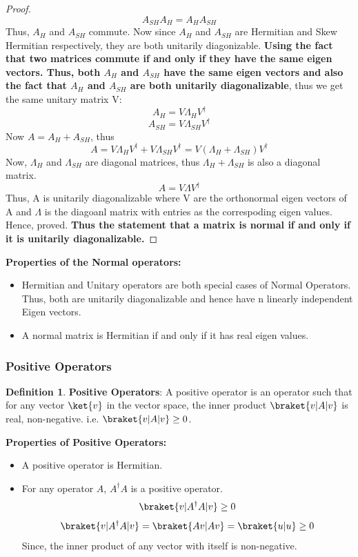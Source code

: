 \documentclass[12pt, oneside]{book}
\theoremstyle{definition}
\newtheorem{definition}{Definition}[section]
\theoremstyle{definition}
\theoremstyle{remark}
\begin{document}
\begin{proof}
    \[A_{SH}A_H=A_HA_{SH}\]
    Thus, $A_H$ and $A_{SH}$ commute. Now since $A_H$ and $A_{SH}$ are Hermitian and Skew Hermitian respectively, they are both unitarily diagonizable.
    \textbf{Using the fact that two matrices commute if and only if they have the same eigen vectors. Thus, both $A_H$ and $A_{SH}$ have the same eigen vectors and also the fact that 
    $A_H$ and $A_{SH}$ are both unitarily diagonalizable}, thus we get the same
    unitary matrix V:
    \[ A_H=V\Lambda_H V^{\dagger} \]
    \[ A_{SH}=V\Lambda_{SH} V^{\dagger} \]
    Now $A=A_H+A_{SH}$, thus
    \[ A=V\Lambda_H V^{\dagger} + V\Lambda_{SH} V^{\dagger} = V(\Lambda_H + \Lambda_{SH})V^{\dagger} \]
    Now, $\Lambda_H$ and $\Lambda_{SH}$ are diagonal matrices, thus $\Lambda_H + \Lambda_{SH}$ is also a diagonal matrix.
    \[ A = V\Lambda V^{\dagger} \]
    Thus, A is unitarily diagonalizable where V are the orthonormal eigen vectors of A and $\Lambda$ is the diagoanl matrix
    with entries as the correspoding eigen values. Hence, proved.
    \textbf{Thus the statement that a matrix is normal if and only if it is unitarily diagonalizable.}
\end{proof}
\textbf{Properties of the Normal operators: }
\begin{itemize}
    \item Hermitian and Unitary operators are both special cases of Normal Operators. Thus, both are unitarily 
    diagonalizable and hence have n linearly independent Eigen vectors.
    \item A normal matrix is Hermitian if and only if it has real eigen values.
\end{itemize}

\subsubsection{Positive Operators}

\begin{definition}
\textbf{Positive Operators}: A positive operator is an operator such that for any vector $\ket{v}$ in the vector space, the inner product $\braket{v|A|v}$ is real, non-negative.
i.e. $\braket{v|A|v} \geq 0$.\\
\end{definition}

\textbf{Properties of Positive Operators: }
\begin{itemize}
    \item A positive operator is Hermitian.
    \item For any operator $A$, $A^{\dagger}A$ is a positive operator.
    \[ \braket{v|A^{\dagger}A|v} \geq 0 \]
    \[ \braket{v|A^{\dagger}A|v}=\braket{Av|Av} = \braket{u|u} \geq 0 \]
    Since, the inner product of any vector with itself is non-negative.
\end{itemize}
\end{document}
